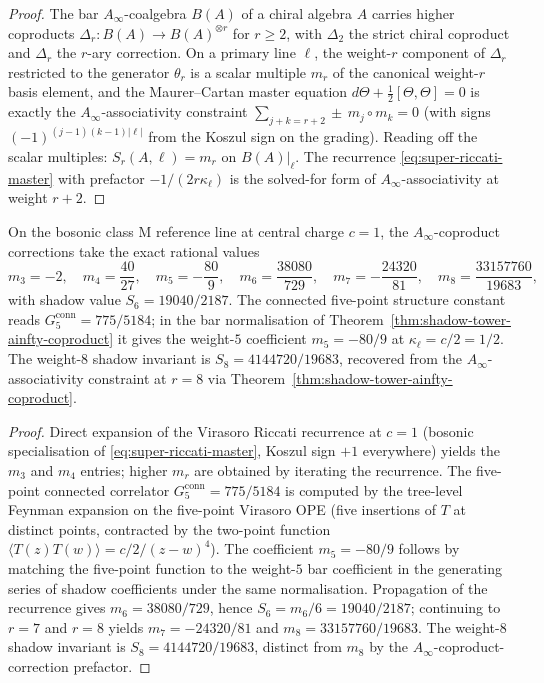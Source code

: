 \begin{proof}[Proof]
The bar $A_\infty$-coalgebra $B(A)$ of a chiral algebra $A$ carries
higher coproducts $\Delta_r : B(A) \to B(A)^{\otimes r}$ for $r \ge 2$,
with $\Delta_2$ the strict chiral coproduct and $\Delta_r$ the
$r$-ary correction. On a primary line $\ell$, the weight-$r$ component
of $\Delta_r$ restricted to the generator $\theta_r$ is a scalar
multiple $m_r$ of the canonical weight-$r$ basis element, and the
Maurer--Cartan master equation $d\Theta + \tfrac{1}{2}[\Theta, \Theta] = 0$
is exactly the $A_\infty$-associativity constraint
$\sum_{j + k = r + 2} \pm \, m_j \circ m_k = 0$ (with signs
$(-1)^{(j-1)(k-1)|\ell|}$ from the Koszul sign on the grading).
Reading off the scalar multiples: $S_r(A, \ell) = m_r$ on
$B(A)|_\ell$. The recurrence \eqref{eq:super-riccati-master} with
prefactor $-1/(2 r \kappa_\ell)$ is the solved-for form of
$A_\infty$-associativity at weight $r + 2$.
\end{proof}

\begin{corollary}[Class M tower at \texorpdfstring{$c = 1$}{c = 1}: exact rational values]
\label{cor:class-M-c1-exact-values}
On the bosonic class M reference line at central charge $c = 1$, the
$A_\infty$-coproduct corrections take the exact rational values
\begin{equation}
\label{eq:class-M-c1-table}
m_3 = -2, \quad
m_4 = \frac{40}{27}, \quad
m_5 = -\frac{80}{9}, \quad
m_6 = \frac{38080}{729}, \quad
m_7 = -\frac{24320}{81}, \quad
m_8 = \frac{33157760}{19683},
\end{equation}
with shadow value $S_6 = 19040/2187$. The connected five-point structure
constant reads $G_5^{\mathrm{conn}} = 775/5184$; in the bar
normalisation of Theorem~\ref{thm:shadow-tower-ainfty-coproduct} it
gives the weight-$5$ coefficient $m_5=-80/9$ at
$\kappa_\ell = c/2 = 1/2$. The weight-$8$ shadow invariant is
$S_8 = 4144720/19683$, recovered from the $A_\infty$-associativity
constraint at $r = 8$ via Theorem~\ref{thm:shadow-tower-ainfty-coproduct}.
\end{corollary}

\begin{proof}[Proof]
Direct expansion of the Virasoro Riccati recurrence at $c = 1$
(bosonic specialisation of \eqref{eq:super-riccati-master}, Koszul
sign $+1$ everywhere) yields the $m_3$ and $m_4$ entries; higher
$m_r$ are obtained by iterating the recurrence. The five-point
connected correlator $G_5^{\mathrm{conn}} = 775/5184$ is computed by
the tree-level Feynman expansion on the five-point Virasoro OPE
(five insertions of $T$ at distinct points, contracted by the
two-point function $\langle T(z) T(w) \rangle = c/2 / (z - w)^4$).
The coefficient $m_5=-80/9$ follows by matching the five-point function
to the weight-$5$ bar coefficient in the generating series of shadow
coefficients under the same normalisation. Propagation of the recurrence gives
$m_6 = 38080/729$, hence $S_6 = m_6/6 = 19040/2187$; continuing to
$r = 7$ and $r = 8$ yields $m_7 = -24320/81$ and
$m_8 = 33157760/19683$. The weight-$8$ shadow invariant is
$S_8 = 4144720/19683$, distinct from $m_8$ by the
$A_\infty$-coproduct-correction prefactor.
\end{proof}

